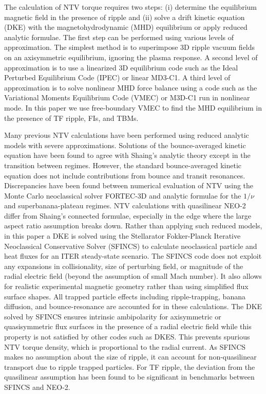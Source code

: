 \documentclass[aip, pop, preprint]{revtex4-1}
\numberwithin{figure}{section}
\numberwithin{equation}{section}
\begin{document}
The calculation of NTV torque requires two steps: (i) determine the equilibrium magnetic field in the presence of ripple and (ii) solve a drift kinetic equation (DKE) with the magnetohydrodynamic (MHD) equilibrium or apply reduced analytic formulae. The first step can be performed using various levels of approximation. The simplest method is to superimpose 3D ripple vacuum fields on an axisymmetric equilibrium, ignoring the plasma response.  A second level of approximation is to use a linearized 3D equilibrium code such as the Ideal Perturbed Equilibrium Code (IPEC) \cite{Park2009} or linear MD3-C1.\cite{Jardin2008} A third level of approximation is to solve nonlinear MHD force balance using a code such as the Variational Moments Equilibrium Code (VMEC) \cite{Hirshman1986a} or M3D-C1 \cite{Ferraro2010} run in nonlinear mode. In this paper we use free-boundary VMEC to find the MHD equilibrium in the presence of TF ripple, FIs, and TBMs. 

Many previous NTV calculations \cite{Zhu2006,Hua2010,Cole2011,Park2009} have been performed using reduced analytic models with severe approximations. Solutions of the bounce-averaged kinetic equation have been found to agree with Shaing's analytic theory except in the transition between regimes.\cite{Sun2010} However, the standard bounce-averaged kinetic equation does not include contributions from bounce and transit resonances. Discrepancies have been found between numerical evaluation of NTV using the Monte Carlo neoclassical solver FORTEC-3D and analytic formulae for the $1/\nu$ and superbanana-plateau regimes.\cite{Satake2011a,Satake2011b} NTV calculations with quasilinear NEO-2 differ from Shaing's connected formulae,\cite{Shaing2010} especially in the edge where the large aspect ratio assumption breaks down.\cite{Martitsch2016} Rather than applying such reduced models, in this paper a DKE is solved using the Stellarator Fokker-Planck Iterative Neoclassical Conservative Solver (SFINCS) \cite{Landreman2014} to calculate neoclassical particle and heat fluxes for an ITER steady-state scenario. The SFINCS code does not exploit any expansions in collisionality, size of perturbing field, or magnitude of the radial electric field (beyond the assumption of small Mach number). It also allows for realistic experimental magnetic geometry rather than using simplified flux surface shapes. All trapped particle effects including ripple-trapping,\cite{Stringer1972} banana diffusion,\cite{Linsker1982} and bounce-resonance\cite{Linsker1982} are accounted for in these calculations. The DKE solved by SFINCS ensures intrinsic ambipolarity for axisymmetric or quasisymmetric flux surfaces in the presence of a radial electric field while this property is not satisfied by other codes such as DKES.\cite{Hirshman1986b,Rij1989} This prevents spurious NTV torque density, which is proportional to the radial current. As SFINCS makes no assumption about the size of ripple, it can account for non-quasilinear transport due to ripple trapped particles. For TF ripple, the deviation from the quasilinear assumption has been found to be significant in benchmarks between SFINCS and NEO-2.\cite{Martitsch2016}
\end{document}
